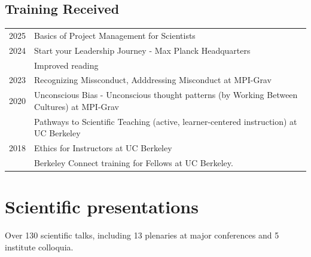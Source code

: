 \documentclass[11pt,a4paper]{article}
\begin{document}
\subsection*{Training Received}
 \vspace{-8pt}
\begin{longtable}{c p{15.5cm}}
2025 & Basics of Project Management for Scientists %
\\[2pt]
2024 & {Start your Leadership Journey} - Max Planck Headquarters  %
\\[2pt]
& Improved reading
\\[2pt]
2023 & {Recognizing Missconduct, Adddressing Misconduct} at MPI-Grav
\\[2pt]
2020 & {Unconscious Bias - Unconscious thought patterns} (by  Working Between Cultures) at MPI-Grav %
\\[2pt]
& {Pathways to Scientific Teaching} (active, learner-centered instruction) at UC Berkeley %
\\[2pt]
2018 & {Ethics for Instructors} at UC Berkeley \\%
 & Berkeley Connect training for Fellows at UC Berkeley. 
\\[2pt]
\end{longtable}


\section*{Scientific presentations}

Over 130 scientific talks, including 13 plenaries at major conferences and 5 institute colloquia. 
\end{document}
